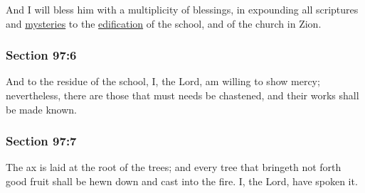 		And I will bless him with a multiplicity of blessings, in expounding all scriptures and \hyperref[MYSTERY]{mysteries} to the \hyperref[EDIFICATION]{edification} of the school, and of the church in Zion.


	\subsubsection{Section 97:6} %
		\label{DC97-6}

		And to the residue of the school, I, the Lord, am willing to show mercy; nevertheless, there are those that must needs be chastened, and their works shall be made known.


	\subsubsection{Section 97:7} %
		\label{DC97-7}

		The ax is laid at the root of the trees; and every tree that bringeth not forth good fruit shall be hewn down and cast into the fire.  I, the Lord, have spoken it.


